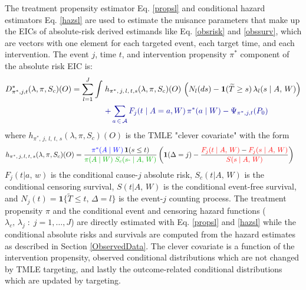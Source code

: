 \documentclass{report}
\newcommand{\1}{\ensuremath{\mathbf{1}}}
\newcommand{\T}{\ensuremath{\widetilde{T}}}
\newcommand{\X}{\ensuremath{{W}}}
\newcommand{\ax}{\ensuremath{\mid a,\,{w}}}
\newcommand{\AX}{\ensuremath{\mid A,\,{W}}}
\newcommand{\trt}{\ensuremath{\pi^*}}
\newcommand{\lj}{\ensuremath{l}}
\newcommand{\jj}{\ensuremath{j}}
\newcommand{\g}{\ensuremath{\pi}}
\begin{document}
The treatment propensity estimator Eq. \eqref{propsl} and conditional hazard estimators Eq. \eqref{hazsl} are used to estimate the nuisance parameters that make up the EICs of absolute-risk derived estimands like Eq. \eqref{obsrisk} and \eqref{obssurv}, which are vectors with one element for each targeted event, each target time, and each intervention. The event \(\jj\), time \(t\), and intervention propensity \(\trt\) component of the absolute risk EIC is:
\begin{align}
    D^*_{\trt, \jj, t}(\lambda, \g, S_c)(O) = \sum_{\lj = 1}^{J} \int \; &h_{\trt,\, \jj,\, \lj,\, t, s}(\lambda, \g, S_c)(O) \, \left(N_{\lj}(ds) - \1(\T \geq s) \, \lambda_\lj(s \AX)\right) \label{eic} \\
    &{\color{blue!60!black}+ \sum_{a\,\in\,\mathcal{A}} F_\jj(t \mid A = a, \X)\,\trt(a \mid \X) - \Psi_{\trt, \jj, t}(P_0)}  \nonumber 
\end{align}
where \(h_{\trt,\, \jj,\, \lj,\, t,\, s}(\lambda, \g, S_c)(O)\) is the TMLE "clever covariate" with the form
\begin{align}
    h_{\trt,\, \jj,\, \lj,\, t,\, s}&(\lambda, \g, S_c)(O) = \frac{{\color{blue}\trt(A \mid \X)\,} \1(s \leq t)}{{\color{green!70!black}\g(A \mid \X) \;S_c(s\text{-} \AX)}} \, \bigg(\1(\Delta = \jj) - \frac{{\color{red}F_\jj(t \AX)} - {\color{red} F_\jj(s \AX)}}{{\color{red} S(s \AX)}}\bigg) \label{clevcov}
\end{align}
\(F_j(t \ax)\) is the conditional cause-\(j\) absolute risk, \(S_c(t \AX)\) is the conditional censoring survival, \(S(t \AX)\) is the conditional event-free survival, and \(N_j(t) = \1\{\T \leq t, \, \Delta = l\}\) is the event-\(j\) counting process. The treatment propensity \(\g\) and the conditional event and censoring hazard functions ( \(\lambda_c,\, \lambda_j \;:\;  j = 1, \dots, J\)) are directly estimated with Eq. \eqref{propsl} and \eqref{hazsl} while the conditional absolute risks and survivals are computed from the hazard estimates as described in Section \ref{ObservedData}. The clever covariate is a function of the {\color{blue}intervention propensity}, {\color{green!70!black}observed conditional distributions} which are not changed by TMLE targeting, and lastly the {\color{red}outcome-related conditional distributions} which are updated by targeting.
\end{document}
